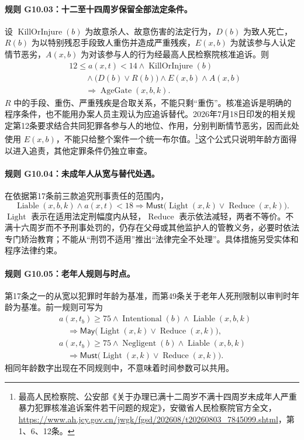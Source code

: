 \paragraph{规则 G10.03：十二至十四周岁保留全部法定条件。}
设 $\operatorname{KillOrInjure}(b)$ 为故意杀人、故意伤害的法定行为，$D(b)$ 为致人死亡，$R(b)$ 为以特别残忍手段致人重伤并造成严重残疾，$E(x,b)$ 为就该参与人认定情节恶劣，$A(x,b)$ 为对该参与人的行为经最高人民检察院核准追诉。则
\[
\begin{aligned}
&12\le a(x,t)<14\land\operatorname{KillOrInjure}(b)\\
&\qquad\land\bigl(D(b)\lor R(b)\bigr)\land E(x,b)\land A(x,b)\\
&\qquad\Longrightarrow\operatorname{AgeGate}(x,b,k).
\end{aligned}
\]
$R$ 中的手段、重伤、严重残疾是合取关系，不能只剩“重伤”。核准追诉是明确的程序条件，也不能用办案人员主观认为应追诉替代。2026年7月18日印发的相关规定第12条要求结合共同犯罪各参与人的地位、作用，分别判断情节恶劣，因而此处使用 $E(x,b)$，不能只给整个案件一个统一布尔值。\footnote{最高人民检察院、公安部《关于办理已满十二周岁不满十四周岁未成年人严重暴力犯罪核准追诉案件若干问题的规定》，安徽省人民检察院官方全文，\url{https://www.ah.jcy.gov.cn/jwgk/fgsd/202608/t20260803_7845099.shtml}，第1、6、12条。}这个公式只说明年龄方面得以进入追责，其他定罪条件仍独立审查。

\paragraph{规则 G10.04：未成年人从宽与替代处遇。}
在依据第17条前三款追究刑事责任的范围内，
\[
\operatorname{Liable}(x,b,k)\land a(x,t)<18
\Longrightarrow\mathsf{Must}\bigl(\operatorname{Light}(x,k)\lor\operatorname{Reduce}(x,k)\bigr).
\]
$\operatorname{Light}$ 表示在适用法定刑幅度内从轻，$\operatorname{Reduce}$ 表示依法减轻，两者不等价。不满十六周岁而不予刑事处罚的，仍存在父母或其他监护人的管教义务，必要时依法专门矫治教育；不能从“刑罚不适用”推出“法律完全不处理”。具体措施另受实体和程序法律约束。

\paragraph{规则 G10.05：老年人规则与时点。}
第17条之一的从宽以犯罪时年龄为基准，而第49条关于老年人死刑限制以审判时年龄为基准。前一规则可写为
\[
\begin{aligned}
&a(x,t_b)\ge75\land\operatorname{Intentional}(b)\land\operatorname{Liable}(x,b,k)\\
&\quad\Longrightarrow\mathsf{May}\bigl(\operatorname{Light}(x,k)\lor\operatorname{Reduce}(x,k)\bigr),\\
&a(x,t_b)\ge75\land\operatorname{Negligent}(b)\land\operatorname{Liable}(x,b,k)\\
&\quad\Longrightarrow\mathsf{Must}\bigl(\operatorname{Light}(x,k)\lor\operatorname{Reduce}(x,k)\bigr).
\end{aligned}
\]
相同年龄数字出现在不同规则中，不意味着时间参数可以共用。

